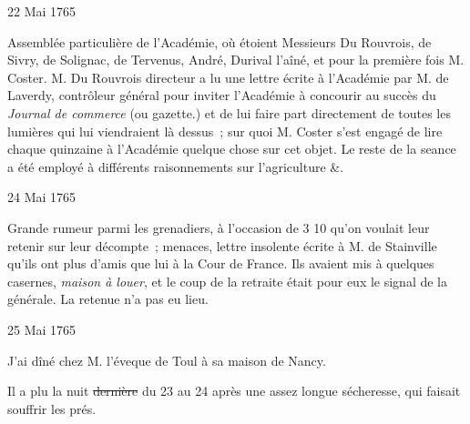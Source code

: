                      \begin{diary}{22 Mai 1765}{}
                        
                         Assemblée particulière de l'Académie, où étoient
                           Messieurs
                           Du Rouvrois, de Sivry, de
                           Solignac, de
                              Tervenus, André,
                              Durival l'aîné, et pour
                           la première fois M. Coster.
                              M. Du Rouvrois
                           directeur a lu une lettre écrite à l'Académie
                           par M. de Laverdy, contrôleur général pour inviter l'Académie à concourir au succès du \emph{Journal
                              de commerce} (ou gazette.) et de lui faire part
                           directement de toutes les lumières qui lui
                           viendraient là dessus ; sur quoi M.
                              Coster s'est
                           engagé de lire chaque quinzaine à l'Académie
                           quelque chose sur cet objet. Le reste de la
                           seance a été employé à différents
                           raisonnements
                           sur l'agriculture &. \bigskip
        
        
                     \end{diary}
                     \begin{diary}{24 Mai 1765}{}
                        
                         Grande rumeur parmi les grenadiers, à
                           l'occasion de 3 10 qu'on
                           voulait leur retenir sur
                           leur décompte ; menaces, lettre insolente écrite
                           à M. de Stainville qu'ils ont
                           plus d'amis que lui
                           à la Cour de France. Ils avaient mis à quelques
                           casernes, \emph{maison à louer}, et le coup de la
                           retraite était pour eux le signal de la générale.
                           La retenue n'a pas eu lieu. \bigskip
        
        
                     \end{diary}
                     \begin{diary}{25 Mai 1765}{}
                        
                         J'ai dîné chez
                           M. l'éveque de Toul à sa maison
                           de Nancy. \bigskip
        
        
                         Il a plu la nuit \sout{dernière} du 23 au 24 après une assez longue
                           sécheresse, qui faisait souffrir les prés. \bigskip
        
        
                     \end{diary}
